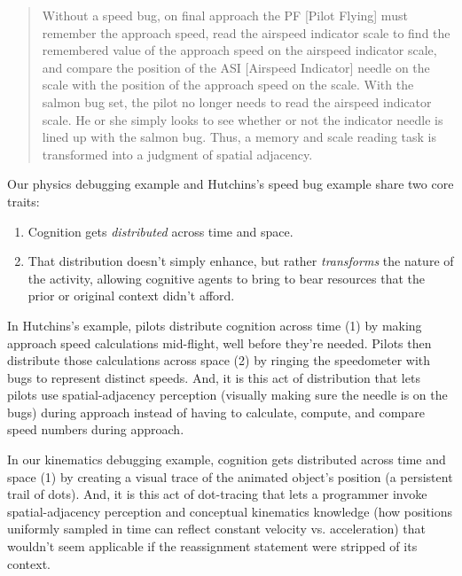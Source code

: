 \begin{quote}
  Without a speed bug, on final approach the PF [Pilot Flying] must remember the approach speed, read the airspeed indicator scale to find the remembered value of the approach speed on the airspeed indicator scale, and compare the position of the ASI [Airspeed Indicator] needle on the scale with the position of the approach speed on the scale. With the salmon bug set, the pilot no longer needs to read the airspeed indicator scale. He or she simply looks to see whether or not the indicator needle is lined up with the salmon bug. Thus, a memory and scale reading task is transformed into a judgment of spatial adjacency. \cite{hutchins_how_1995}
\end{quote}

Our physics debugging example and Hutchins's speed bug example \cite{hutchins_how_1995} share two core traits:

\begin{enumerate}
  \tightlist
  \item Cognition gets \emph{distributed} \cite{hutchins_distributed_2000,hutchins_cognition_1995} across time and space.
  \item That distribution doesn't simply enhance, but rather \emph{transforms} the nature of the activity, allowing cognitive agents to bring to bear resources that the prior or original context didn't afford.
\end{enumerate}

In Hutchins's \cite{hutchins_how_1995} example, pilots distribute cognition across time (1) by making approach speed calculations mid-flight, well before they're needed. Pilots then distribute those calculations across space (2) by ringing the speedometer with bugs to represent distinct speeds. And, it is this act of distribution that lets pilots use spatial-adjacency perception (visually making sure the needle is on the bugs) during approach instead of having to calculate, compute, and compare speed numbers during approach.

In our kinematics debugging example, cognition gets distributed across time and space (1) by creating a visual trace of the animated object's position (a persistent trail of dots). And, it is this act of dot-tracing that lets a programmer invoke spatial-adjacency perception and conceptual kinematics knowledge (how positions uniformly sampled in time can reflect constant velocity vs. acceleration) that wouldn't seem applicable if the reassignment statement were stripped of its context.

